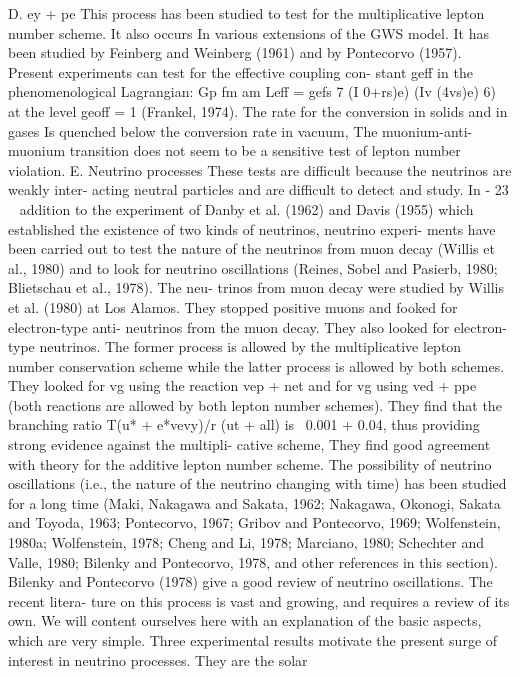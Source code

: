 \documentclass[twoside]{article}
\begin{document}
{{{{{D. ey + pe
This process has been studied to test for the multiplicative lepton
number scheme. It also occurs In various extensions of the GWS model.
It has been studied by Feinberg and Weinberg (1961) and by Pontecorvo
(1957). Present experiments can test for the effective coupling con-
stant geff in the phenomenological Lagrangian:
Gp fm am
Leff = gefs 7 (I 0+rs)e) (Iv (4vs)e) 6)
at the level geoff = 1 (Frankel, 1974). The rate for the conversion in
solids and in gases Is quenched below the conversion rate in vacuum,
The muonium-anti-muonium transition does not seem to be a sensitive
test of lepton number violation.
E. Neutrino processes
These tests are difficult because the neutrinos are weakly inter-
acting neutral particles and are difficult to detect and study. In
- 23 ~
addition to the experiment of Danby et al. (1962) and Davis (1955) which
established the existence of two kinds of neutrinos, neutrino experi-
ments have been carried out to test the nature of the neutrinos from
muon decay (Willis et al., 1980) and to look for neutrino oscillations
(Reines, Sobel and Pasierb, 1980; Blietschau et al., 1978). The neu-
trinos from muon decay were studied by Willis et al. (1980) at Los
Alamos. They stopped positive muons and fooked for electron-type anti-
neutrinos from the muon decay. They also looked for electron-type
neutrinos. The former process is allowed by the multiplicative lepton
number conservation scheme while the latter process is allowed by both
schemes. They looked for vg using the reaction vep + net and for vg
using ved + ppe~ (both reactions are allowed by both lepton number
schemes). They find that the branching ratio T(u* + e*vevy)/r (ut + all)
is ~0.001 + 0.04, thus providing strong evidence against the multipli-
cative scheme, They find good agreement with theory for the additive
lepton number scheme.
The possibility of neutrino oscillations (i.e., the nature of the
neutrino changing with time) has been studied for a long time (Maki,
Nakagawa and Sakata, 1962; Nakagawa, Okonogi, Sakata and Toyoda, 1963;
Pontecorvo, 1967; Gribov and Pontecorvo, 1969; Wolfenstein, 1980a; Wolfenstein,
1978; Cheng and Li, 1978; Marciano, 1980; Schechter and Valle, 1980; Bilenky and
Pontecorvo, 1978, and other references in this section). Bilenky and Pontecorvo
(1978) give a good review of neutrino oscillations. The recent litera-
ture on this process is vast and growing, and requires a review of its
own. We will content ourselves here with an explanation of the basic
aspects, which are very simple. Three experimental results motivate
the present surge of interest in neutrino processes. They are the solar
}}}}}
\end{document}
